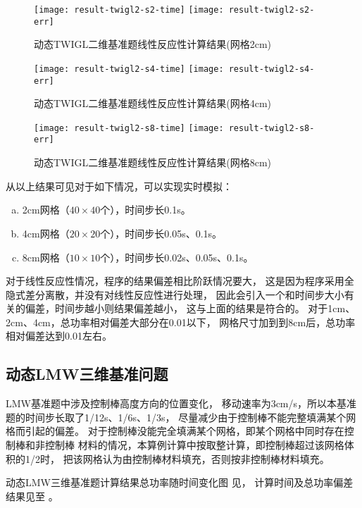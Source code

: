 \begin{figure}[H]
\centering
\texttt{[image: result-twigl2-s2-time]}
\texttt{[image: result-twigl2-s2-err]}
\caption{动态TWIGL二维基准题线性反应性计算结果(网格2cm)\label{fig:testresult.twigl.2.2}}
\end{figure}

\begin{figure}[H]
\centering
\texttt{[image: result-twigl2-s4-time]}
\texttt{[image: result-twigl2-s4-err]}
\caption{动态TWIGL二维基准题线性反应性计算结果(网格4cm)\label{fig:testresult.twigl.2.4}}
\end{figure}

\begin{figure}[H]
\centering
\texttt{[image: result-twigl2-s8-time]}
\texttt{[image: result-twigl2-s8-err]}
\caption{动态TWIGL二维基准题线性反应性计算结果(网格8cm)\label{fig:testresult.twigl.2.8}}
\end{figure}

从以上结果可见对于如下情况，可以实现实时模拟：
\begin{enumerate}[a)]
\item 2cm网格（$40\times40$个），时间步长0.1s。
\item 4cm网格（$20\times20$个），时间步长0.05s、0.1s。
\item 8cm网格（$10\times10$个），时间步长0.02s、0.05s、0.1s。
\end{enumerate}

对于线性反应性情况，\ProgramName 程序的结果偏差相比阶跃情况要大，
这是因为\ProgramName 程序采用全隐式差分离散，并没有对线性反应性进行处理，
因此会引入一个和时间步大小有关的偏差，时间步越小则结果偏差越小，
这与上面的结果是符合的。
对于1cm、2cm、4cm，总功率相对偏差大部分在0.01以下，
网格尺寸加到到8cm后，总功率相对偏差达到0.01左右。


\subsection{动态LMW三维基准问题}

LMW基准题中涉及控制棒高度方向的位置变化，
移动速率为3cm/s，所以本基准题的时间步长取了1/12s、1/6s、1/3s，
尽量减少由于控制棒不能完整填满某个网格而引起的偏差。
对于控制棒没能完全填满某个网格，即某个网格中同时存在控制棒和非控制棒
材料的情况，本算例计算中按取整计算，即控制棒超过该网格体积的1/2时，
把该网格认为由控制棒材料填充，否则按非控制棒材料填充。

动态LMW三维基准题计算结果总功率随时间变化图
见，
计算时间及总功率偏差结果见至
。

